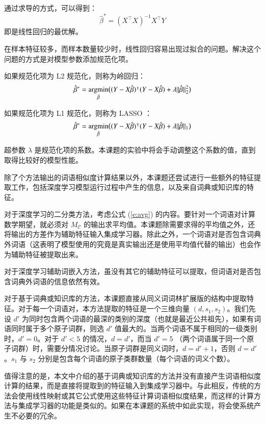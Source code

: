 通过求导的方式，可以得到：
\begin{equation}
\hat{\beta}^* = (X^\intercal X)^{-1} X^\intercal Y
\end{equation}
即是线性回归的最优解。

在样本特征较多，而样本数量较少时，线性回归容易出现过拟合的问题。解决这个问题的方式是对模型参数添加规范化项。

如果规范化项为 L2 规范化，则称为岭回归：
\begin{equation}
\hat{\beta}^* = \operatorname*{argmin}_{\hat{\beta}} \bigl((Y - X \hat{\beta})^\intercal (Y - X \hat{\beta}) + \lambda ||\hat{\beta}||^2_2\bigr)
\end{equation}

如果规范化项为 L1 规范化，则称为 LASSO ：
\begin{equation}
\hat{\beta}^* = \operatorname*{argmin}_{\hat{\beta}} \bigl((Y - X \hat{\beta})^\intercal (Y - X \hat{\beta}) + \lambda ||\hat{\beta}||_1\bigr)
\end{equation}

超参数 $\lambda$ 是规范化项的系数。本课题的实验中将会手动调整这个系数的值，直到取得比较好的模型性能。

\label{s:ensemble features}
除了个方法输出的词语相似度计算结果以外，本课题还尝试进行一些额外的特征提取工作，包括深度学习模型运行过程中产生的信息，以及来自词典或知识库的特征。

对于深度学习的二分类方法，考虑公式 (\ref{e:avg}) 的内容。要针对一个词语对计算数学期望，就必须对 $M_\mathcal{C}$ 的输出求平均值。本课题除需要求得的平均值之外，还将输出的方差作为辅助特征输入集成学习器。除此之外，一个词语对是否包含词典外词语（这表明了模型使用的究竟是真实输出还是使用平均值代替的输出）也会作为辅助特征被提取出来。

对于深度学习辅助词嵌入方法，虽没有其它的辅助特征可以提取，但词语对是否包含词典外词语的信息依然有效。

对于基于词典或知识库的方法，本课题直接从同义词词林扩展版的结构中提取特征。对于每一个词语对，本方法提取的特征是一个三维向量 $(d, s_1, s_2)$。我们先设 $d'$ 为同时包含两个词语的最深的类别的深度（也就是最近公共祖先），如果有词语同时属于多个原子词群，则选 $d'$ 值最大的。当两个词语不属于相同的一级类别时，$d' = 0$。对于 $d' < 5$ 的情况，$d = d'$，而当 $d' = 5$ （两个词语属于同一个原子词群）时，需要分情况讨论。当原子词群是同义词时，$d = d' + 1$，否则 $d = d'$。$s_1$ 与 $s_2$ 分别是包含每个词语的原子类群数量（每个词语的词义个数）。

值得注意的是，本文中介绍的基于词典或知识库的方法并没有直接产生词语相似度计算的结果，而是直接将提取到的特征输入到集成学习器中。与此相反，传统的方法会使用线性映射或其它公式使用这些特征计算词语相似度结果，而这样的计算方法与集成学习器的功能是类似的。如果在本课题的系统中如此实现，将会使系统产生不必要的冗余。

